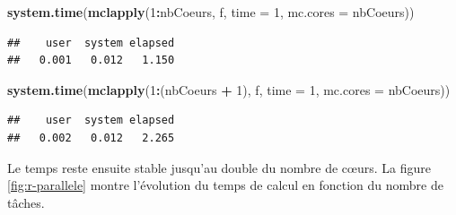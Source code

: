 \documentclass[
  12pt,
  french,
  a4paper,
  extrafontsizes,onecolumn,openright
  ]{memoir}
\newenvironment{Shaded}{\begin{snugshade}}{\end{snugshade}}
\newcommand{\AttributeTok}[1]{\textcolor[rgb]{0.13,0.29,0.53}{#1}}
\newcommand{\DecValTok}[1]{\textcolor[rgb]{0.00,0.00,0.81}{#1}}
\newcommand{\FunctionTok}[1]{\textcolor[rgb]{0.13,0.29,0.53}{\textbf{#1}}}
\newcommand{\NormalTok}[1]{#1}
\newcommand{\SpecialCharTok}[1]{\textcolor[rgb]{0.81,0.36,0.00}{\textbf{#1}}}
\begin{document}
\scriptsize

\begin{Shaded}
\begin{Highlighting}[]
\FunctionTok{system.time}\NormalTok{(}\FunctionTok{mclapply}\NormalTok{(}\DecValTok{1}\SpecialCharTok{:}\NormalTok{nbCoeurs, f, }\AttributeTok{time =} \DecValTok{1}\NormalTok{, }\AttributeTok{mc.cores =}\NormalTok{ nbCoeurs))}
\end{Highlighting}
\end{Shaded}

\begin{verbatim}
##    user  system elapsed 
##   0.001   0.012   1.150
\end{verbatim}

\begin{Shaded}
\begin{Highlighting}[]
\FunctionTok{system.time}\NormalTok{(}\FunctionTok{mclapply}\NormalTok{(}\DecValTok{1}\SpecialCharTok{:}\NormalTok{(nbCoeurs }\SpecialCharTok{+} \DecValTok{1}\NormalTok{), f, }\AttributeTok{time =} \DecValTok{1}\NormalTok{, }\AttributeTok{mc.cores =}\NormalTok{ nbCoeurs))}
\end{Highlighting}
\end{Shaded}

\begin{verbatim}
##    user  system elapsed 
##   0.002   0.012   2.265
\end{verbatim}

\normalsize

Le temps reste ensuite stable jusqu'au double du nombre de cœurs.
La figure \ref{fig:r-parallele} montre l'évolution du temps de calcul en fonction du nombre de tâches.



\scriptsize
\end{document}
